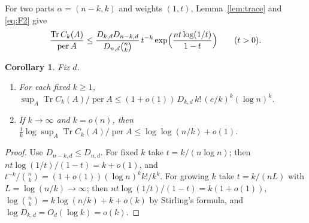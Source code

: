 \documentclass[11pt,a4paper]{article}
\newtheorem{corollary}[theorem]{Corollary}
\theoremstyle{remark}
\newcommand{\per}{\operatorname{per}}
\newcommand{\Tr}{\operatorname{Tr}}
\begin{document}
For two parts $\alpha=(n-k,k)$ and weights $(1,t)$, Lemma~\ref{lem:trace} and \eqref{eq:F2} give
\begin{equation}\label{eq:twocolour}
 \frac{\Tr C_k(A)}{\per A}\le\frac{D_{k,d}D_{n-k,d}}{D_{n,d}\binom nk}\,t^{-k}\exp\Bigl(\frac{nt\log(1/t)}{1-t}\Bigr)\qquad(t>0).
\end{equation}
\begin{corollary}\label{cor:Ck}
Fix $d$.
\begin{enumerate}
\item For each fixed $k\ge1$, $\sup_A\Tr C_k(A)/\per A\le(1+o(1))\,D_{k,d}\,k!\,(e/k)^k(\log n)^k$.
\item If $k\to\infty$ and $k=o(n)$, then $\frac1k\log\sup_A\Tr C_k(A)/\per A\le\log\log(n/k)+o(1)$.
\end{enumerate}
\end{corollary}
\begin{proof}
Use $D_{n-k,d}\le D_{n,d}$. For fixed $k$ take $t=k/(n\log n)$; then $nt\log(1/t)/(1-t)=k+o(1)$, and $t^{-k}/\binom nk=(1+o(1))(\log n)^kk!/k^k$. For growing $k$ take $t=k/(nL)$ with $L=\log(n/k)\to\infty$; then $nt\log(1/t)/(1-t)=k(1+o(1))$, $\log\binom nk=k\log(n/k)+k+o(k)$ by Stirling's formula, and $\log D_{k,d}=O_d(\log k)=o(k)$.
\end{proof}
\end{document}
